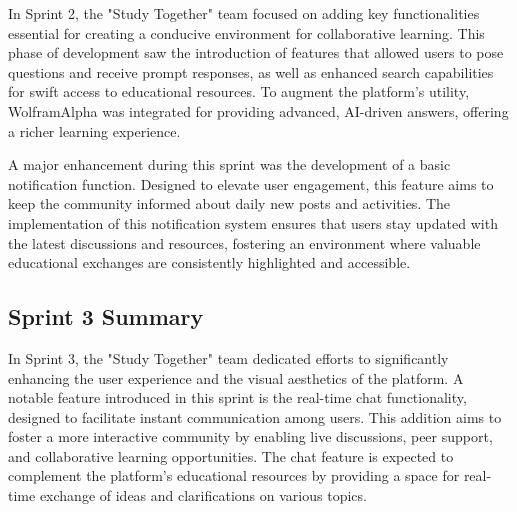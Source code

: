 In Sprint 2, the "Study Together" team focused on adding key functionalities essential for creating a conducive environment for collaborative learning. This phase of development saw the introduction of features that allowed users to pose questions and receive prompt responses, as well as enhanced search capabilities for swift access to educational resources. To augment the platform's utility, WolframAlpha was integrated for providing advanced, AI-driven answers, offering a richer learning experience.

A major enhancement during this sprint was the development of a basic notification function. Designed to elevate user engagement, this feature aims to keep the community informed about daily new posts and activities. The implementation of this notification system ensures that users stay updated with the latest discussions and resources, fostering an environment where valuable educational exchanges are consistently highlighted and accessible.

\subsection{Sprint 3 Summary}

In Sprint 3, the "Study Together" team dedicated efforts to significantly enhancing the user experience and the visual aesthetics of the platform. A notable feature introduced in this sprint is the real-time chat functionality, designed to facilitate instant communication among users. This addition aims to foster a more interactive community by enabling live discussions, peer support, and collaborative learning opportunities. The chat feature is expected to complement the platform's educational resources by providing a space for real-time exchange of ideas and clarifications on various topics.

